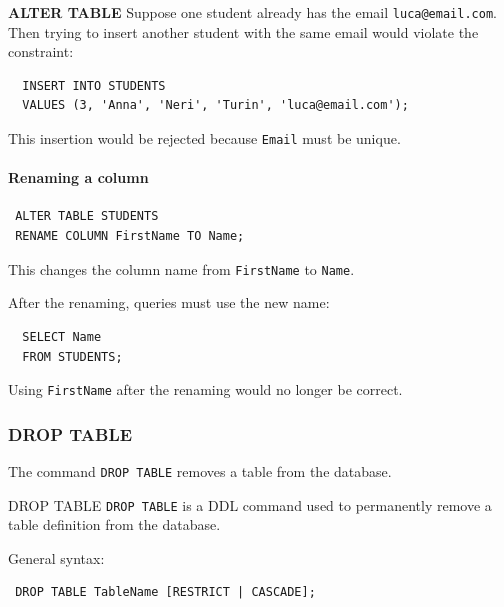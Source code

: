 \begin{example}{\textbf{ALTER TABLE}}
  Suppose one student already has the email \texttt{luca@email.com}. Then trying to insert another student with the same email would violate the constraint:
  \begin{verbatim}
  INSERT INTO STUDENTS
  VALUES (3, 'Anna', 'Neri', 'Turin', 'luca@email.com');
  \end{verbatim}

  \vspace{-0.3cm}
  This insertion would be rejected because \texttt{Email} must be unique.


 \paragraph{Renaming a column}

 \begin{verbatim}
 ALTER TABLE STUDENTS
 RENAME COLUMN FirstName TO Name;
 \end{verbatim}

 \vspace{-0.3cm}

 This changes the column name from \texttt{FirstName} to \texttt{Name}.


  After the renaming, queries must use the new name:
  \begin{verbatim}
  SELECT Name
  FROM STUDENTS;
  \end{verbatim}

  \vspace{-0.3cm}

  Using \texttt{FirstName} after the renaming would no longer be correct.
 \end{example}



 \subsubsection{DROP TABLE}

 The command \texttt{DROP TABLE} removes a table from the database.



 \begin{defbox}{DROP TABLE}
  \texttt{DROP TABLE} is a DDL command used to permanently remove a table definition from the database.
 \end{defbox}

 General syntax:

 \begin{verbatim}
 DROP TABLE TableName [RESTRICT | CASCADE];
 \end{verbatim}

